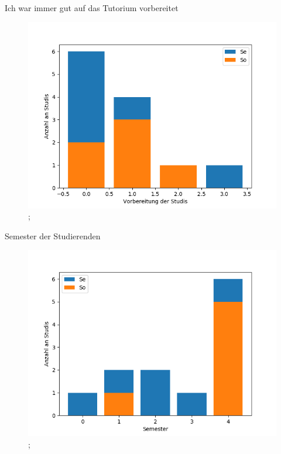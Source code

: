 \documentclass[10pt]{beamer}
\begin{document}
\begin{frame}[fragile]{Ich war immer gut auf das Tutorium vorbereitet} 
 \begin{figure}
 \includegraphics[width= 0.9\linewidth]{./PDFcreater/Plots/Nx/Ich+war+immer+gut+auf+das+Tutorium+vorbereitet.png};
 \end{figure}
 \end{frame}
\begin{frame}[fragile]{Semester der Studierenden} 
 \begin{figure}
 \includegraphics[width= 0.9\linewidth]{./PDFcreater/Plots/Nx/Semester+der+Studierenden.png};
 \end{figure}
 \end{frame}
\end{document}
